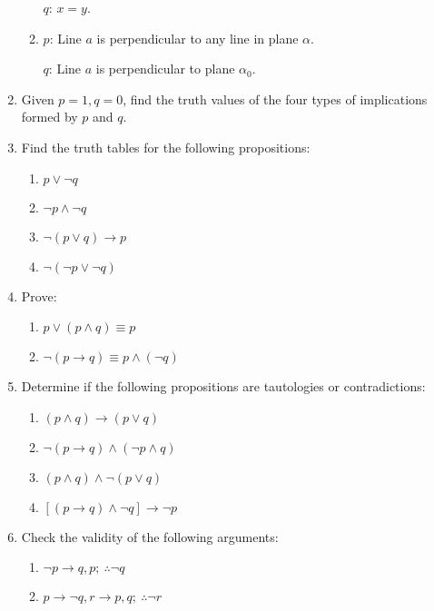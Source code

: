 \documentclass{report}
\begin{document}
\begin{enumerate}[leftmargin=*]
\begin{enumerate}[label=(\alph*)]
                    $q$: $x = y$.

              \item $p$: Line $a$ is perpendicular to any line in plane $\alpha$.

                    $q$: Line $a$ is perpendicular to plane $\alpha_0$.
          \end{enumerate}

    \item Given $p = 1, q = 0$, find the truth values of the four types of implications
          formed by $p$ and $q$.

    \item Find the truth tables for the following propositions:
          \begin{enumerate}[label=(\alph*)]
              \item $p \lor \neg q$
              \item $\neg p \land \neg q$
              \item $\neg(p \lor q) \rightarrow p$
              \item $\neg(\neg p \lor \neg q)$
          \end{enumerate}

          \newpage
    \item Prove:
          \begin{enumerate}[label=(\alph*)]
              \item $p \lor (p \land q) \equiv p$
              \item $\neg(p \rightarrow q) \equiv p \land (\neg q)$
          \end{enumerate}

    \item Determine if the following propositions are tautologies or contradictions:
          \begin{enumerate}[label=(\alph*)]
              \item $(p \land q) \rightarrow (p \lor q)$
              \item $\neg(p \rightarrow q) \land (\neg p \land q)$
              \item $(p \land q) \land \neg(p \lor q)$
              \item $[(p \rightarrow q) \land \neg q] \rightarrow \neg p$
          \end{enumerate}

    \item Check the validity of the following arguments:
          \begin{enumerate}[label=(\alph*)]
              \item $\neg p \rightarrow q, p;\ \therefore \neg q$
              \item $p \rightarrow \neg q, r \rightarrow p, q;\ \therefore \neg r$
          \end{enumerate}


\end{enumerate}
\end{document}
